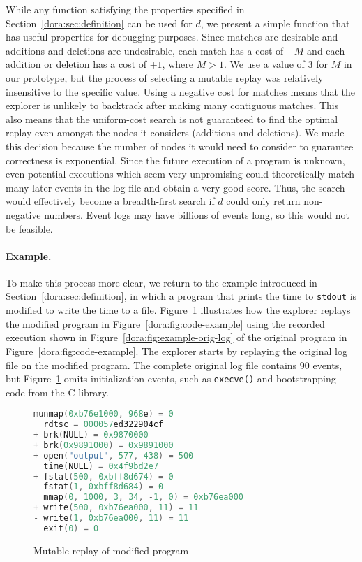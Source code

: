 While any function satisfying the properties specified in
Section~\ref{dora:sec:definition} can be used for $d$, we present a simple
function that has useful properties for debugging purposes.
Since matches are desirable and additions and deletions are undesirable,
each match has a cost of $-M$ and each addition or deletion has a cost of
$+1$, where $M > 1$. We use a value of $3$ for $M$ in our prototype,
but the process of selecting a mutable replay was relatively
insensitive to the specific value.
Using a negative cost for matches
means that the explorer is unlikely to backtrack after making many
contiguous matches.  This also means that the uniform-cost search
is not guaranteed to find the optimal replay even amongst the nodes it
considers (additions and deletions).  We made this decision because
the number of nodes it would need to consider to guarantee correctness
is exponential. Since the future execution of a program is 
unknown, even potential executions which seem very unpromising could
theoretically match many later events in the log file and obtain a very good
score. Thus, the search would effectively become a breadth-first search if $d$
could only return non-negative numbers.  Event logs may have billions of
events long, so this would not be feasible.

\paragraph{Example.}
To make this process more clear, we return to the example introduced in
Section~\ref{dora:sec:definition}, in which a program that prints the time to
{\tt stdout} is modified to write the time to a file.
Figure~\ref{dora:fig:diff} illustrates how the explorer replays the
modified program in Figure~\ref{dora:fig:code-example} using the recorded execution
shown in Figure~\ref{dora:fig:example-orig-log} of the original program in 
Figure~\ref{dora:fig:code-example}. The explorer starts by replaying the
original log file on the modified program. The complete original log file
contains 90 events, but Figure~\ref{dora:fig:diff} omits initialization
events, such as {\tt execve()} and bootstrapping code from the C library. 

\begin{figure}
\centering
\begin{minipage}{.6\textwidth}
\small
\begin{lstlisting}[framexleftmargin=5pt,language=C,basicstyle=\ttfamily]
  munmap(0xb76e1000, 968e) = 0
  rdtsc = 000057ed322904cf
+ brk(NULL) = 0x9870000
+ brk(0x9891000) = 0x9891000
+ open("output", 577, 438) = 500
  time(NULL) = 0x4f9bd2e7
+ fstat(500, 0xbff8d674) = 0
- fstat(1, 0xbff8d684) = 0
  mmap(0, 1000, 3, 34, -1, 0) = 0xb76ea000
+ write(500, 0xb76ea000, 11) = 11
- write(1, 0xb76ea000, 11) = 11
  exit(0) = 0
\end{lstlisting}
\end{minipage}
\caption{Mutable replay of modified program}
\label{dora:fig:diff}
\end{figure}

